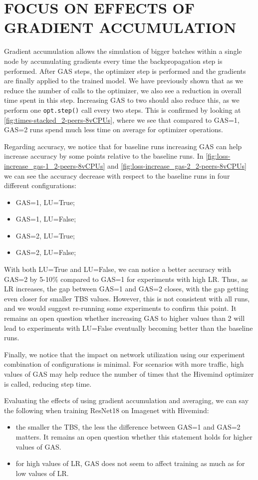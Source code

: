 \section{FOCUS ON EFFECTS OF GRADIENT ACCUMULATION}\label{sec:focus-gradient-acc}

Gradient accumulation allows the simulation of bigger batches within a single node by accumulating gradients every time the backpropagation step is performed.
After GAS steps, the optimizer step is performed and the gradients are finally applied to the trained model.
We have previously shown that as we reduce the number of calls to the optimizer, we also see a reduction in overall time spent in this step.
Increasing GAS to two should also reduce this, as we perform one \texttt{opt.step()} call every two steps.
This is confirmed by looking at \autoref{fig:times-stacked_2-peers-8vCPUs}, where we see that compared to GAS=1, GAS=2 runs spend much less time on average for optimizer operations.

Regarding accuracy, we notice that for baseline runs increasing GAS can help increase accuracy by some points relative to the baseline runs.
In \autoref{fig:loss-increase_gas-1_2-peers-8vCPUs} and \autoref{fig:loss-increase_gas-2_2-peers-8vCPUs} we can see the accuracy decrease with respect to the baseline runs in four different configurations:
\begin{itemize}
    \item GAS=1, LU=True;
    \item GAS=1, LU=False;
    \item GAS=2, LU=True;
    \item GAS=2, LU=False;
\end{itemize}

With both LU=True and LU=False, we can notice a better accuracy with GAS=2 by 5-10\% compared to GAS=1 for experiments with high LR.
Thus, as LR increases, the gap between GAS=1 and GAS=2 closes, with the gap getting even closer for smaller TBS values.
However, this is not consistent with all runs, and we would suggest re-running some experiments to confirm this point.
It remains an open question whether increasing GAS to higher values than 2 will lead to experiments with LU=False eventually becoming better than the baseline runs.

Finally, we notice that the impact on network utilization using our experiment combination of configurations is minimal.
For scenarios with more traffic, high values of GAS may help reduce the number of times that the Hivemind optimizer is called, reducing step time.

Evaluating the effects of using gradient accumulation and averaging, we can say the following when training ResNet18 on Imagenet with Hivemind:
\begin{itemize}
    \item the smaller the TBS, the less the difference between GAS=1 and GAS=2 matters.
          It remains an open question whether this statement holds for higher values of GAS.
    \item for high values of LR, GAS does not seem to affect training as much as for low values of LR.
\end{itemize}
